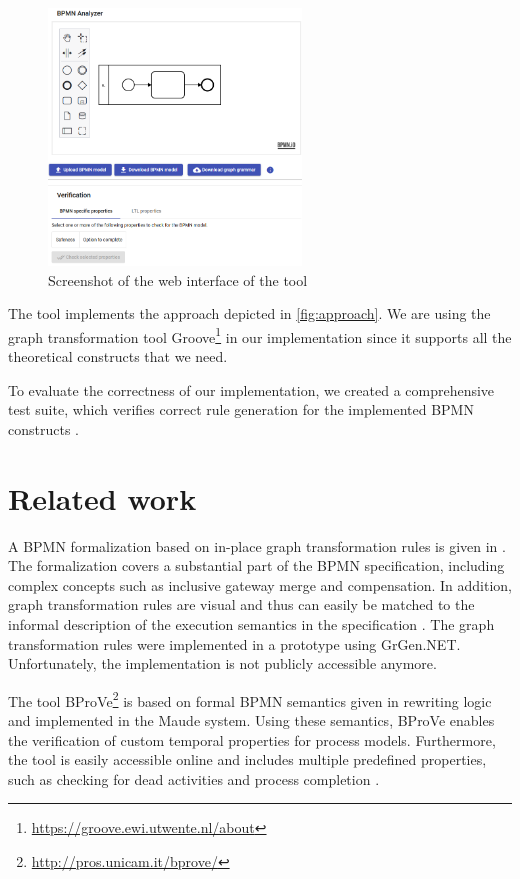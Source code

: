 \documentclass[adraft, copyright, creativecommons]{eptcs} %
\begin{document}
\begin{figure}[h]
    \centering
    \includegraphics[width=0.6\textwidth]{images/impl.png}
    \caption{Screenshot of the web interface of the tool}
    \label{fig:implScreenshot}
\end{figure}

The tool implements the approach depicted in \cref{fig:approach}.
We are using the graph transformation tool Groove\footnote{\url{https://groove.ewi.utwente.nl/about}} in our implementation \cite{ghamarianModellingAnalysisUsing2012, rensinkGROOVESimulatorTool2004} since it supports all the theoretical constructs that we need.

To evaluate the correctness of our implementation, we created a comprehensive test suite, which verifies correct rule generation for the implemented BPMN constructs \cite{timkrauterArtifactsTERMGRAPH2022}.
\section{Related work} \label{sec:relatedWork}
A BPMN formalization based on in-place graph transformation rules is given in \cite{vangorpVisualTokenbasedFormalization2013}.
The formalization covers a substantial part of the BPMN specification, including complex concepts such as inclusive gateway merge and compensation.
In addition, graph transformation rules are visual and thus can easily be matched to the informal description of the execution semantics in the specification \cite{objectmanagementgroupBusinessProcessModel2013}.
The graph transformation rules were implemented in a prototype using GrGen.NET.
Unfortunately, the implementation is not publicly accessible anymore.

The tool BProVe\footnote{\url{http://pros.unicam.it/bprove/}} is based on formal BPMN semantics given in rewriting logic and implemented in the Maude system.
Using these semantics, BProVe enables the verification of custom temporal properties for process models.
Furthermore, the tool is easily accessible online and includes multiple predefined properties, such as checking for dead activities and process completion \cite{corradiniBProVeToolSupport2017, corradiniFormalApproachAnalysis2021}.
\end{document}
